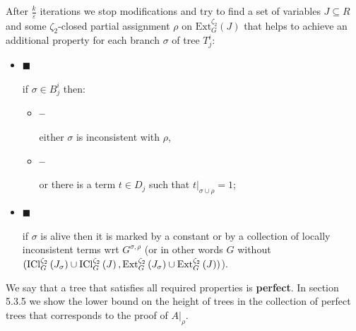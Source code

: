 \documentclass[10pt,a4paper]{article}
\begin{document}
After $\frac{k}{\varepsilon}$ iterations we stop modifications and try to find a set of variables $J\subseteq R$ and some $\zeta_{2}$-closed partial assignment $\rho$ on $\mathrm{Ext}_{G}^{\zeta_{2}}\left(J\right)$ that helps to
achieve an additional property for each branch $\sigma$ of tree $T^{i}_{j}$:\par


\begin{itemize}


\item[] 
$\blacksquare$ 


if $\sigma\in B^{i}_{j}$ then:\par


\begin{itemize}


\item[] 
\textbf{–} 


either $\sigma$ is inconsistent with $\rho$,\par





\item[] 
\textbf{–} 


or there is a term $t\in D_{j}$ such that $t|_{\sigma\cup\rho}=1$;\par





\end{itemize}





\item[] 
$\blacksquare$ 


if $\sigma$ is alive then it is marked by a constant or by a collection of locally
inconsistent terms wrt $G^{\sigma,\rho}$ (or in other words $G$ without
$(\mathrm{ICl}_{G}^{\zeta_{2}}\left(J_{\sigma}\right)\cup\mathrm{ICl}_{G}^{%
\zeta_{2}}\left(J\right),\mathrm{Ext}_{G}^{\zeta_{2}}\left(J_{\sigma}\right)%
\cup\mathrm{Ext}_{G}^{\zeta_{2}}\left(J\right))$).\par





\end{itemize}


We say that a tree that satisfies all required properties is \textbf{perfect}. In section
5.3.5 we show the lower bound on the height of trees in the collection of perfect
trees that corresponds to the proof of $A|_{\rho}$.\par
\end{document}
